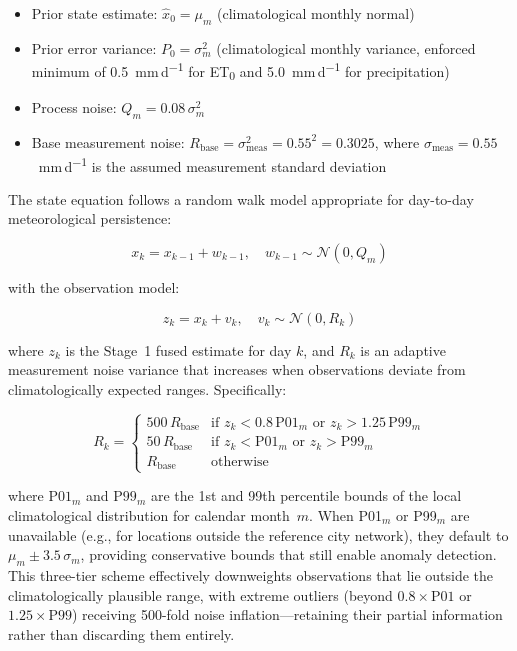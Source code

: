 \documentclass[preprint,review,12pt]{elsarticle}
\begin{document}
\begin{itemize}
\item Prior state estimate: $\hat{x}_0 = \mu_m$ (climatological monthly normal)
\item Prior error variance: $P_0 = \sigma_m^2$ (climatological monthly variance,
  enforced minimum of 0.5~mm\,d\textsuperscript{$-1$} for ET\textsubscript{0}
  and 5.0~mm\,d\textsuperscript{$-1$} for precipitation)
\item Process noise: $Q_m = 0.08\,\sigma_m^2$
\item Base measurement noise: $R_{\text{base}} = \sigma_{\text{meas}}^2 =
  0.55^2 = 0.3025$, where $\sigma_{\text{meas}} = 0.55$~mm\,d\textsuperscript{$-1$}
  is the assumed measurement standard deviation
\end{itemize}

The state equation follows a random walk model appropriate for day-to-day
meteorological persistence:

\begin{equation}
x_k = x_{k-1} + w_{k-1}, \quad w_{k-1} \sim \mathcal{N}(0, Q_m)
\label{eq:kalman_state}
\end{equation}

\noindent with the observation model:

\begin{equation}
z_k = x_k + v_k, \quad v_k \sim \mathcal{N}(0, R_k)
\label{eq:kalman_obs}
\end{equation}

\noindent where $z_k$ is the Stage~1 fused estimate for day $k$, and $R_k$ is
an adaptive measurement noise variance that increases when observations deviate
from climatologically expected ranges. Specifically:

\begin{equation}
R_k =
\begin{cases}
500\,R_{\text{base}} & \text{if } z_k < 0.8\,\text{P01}_m \text{ or } z_k > 1.25\,\text{P99}_m \\
50\,R_{\text{base}} & \text{if } z_k < \text{P01}_m \text{ or } z_k > \text{P99}_m \\
R_{\text{base}} & \text{otherwise}
\end{cases}
\label{eq:adaptive_R}
\end{equation}

\noindent where $\text{P01}_m$ and $\text{P99}_m$ are the 1st and 99th
percentile bounds of the local climatological distribution for calendar
month~$m$. When P01$_m$ or P99$_m$ are unavailable (e.g., for locations
outside the reference city network), they default to
$\mu_m \pm 3.5\,\sigma_m$, providing conservative bounds that still enable
anomaly detection. This three-tier scheme effectively downweights observations
that lie outside the climatologically plausible range, with extreme outliers
(beyond $0.8 \times \text{P01}$ or $1.25 \times \text{P99}$) receiving
500-fold noise inflation---retaining their partial information rather than
discarding them entirely.
\end{document}
